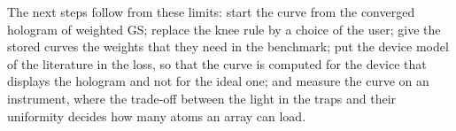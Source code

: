 The next steps follow from these limits: start the curve from the converged hologram of weighted GS; replace the knee rule by a choice of the user; give the stored curves the weights that they need in the benchmark; put the device model of the literature in the loss, so that the curve is computed for the device that displays the hologram and not for the ideal one; and measure the curve on an instrument, where the trade-off between the light in the traps and their uniformity decides how many atoms an array can load.
